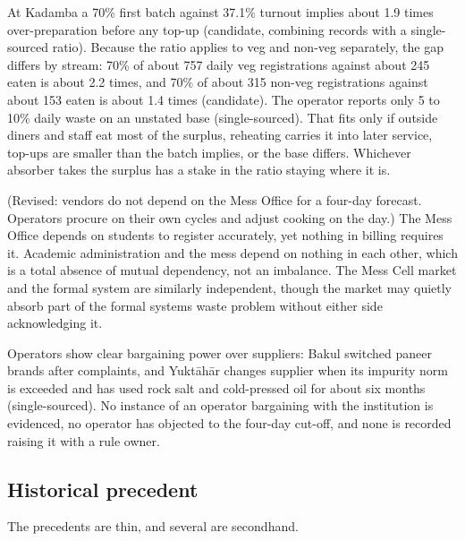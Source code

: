 \documentclass[
  10pt,
  table]{article}
\newcounter{none} %
\begin{document}
At Kadamba a 70\% first batch against 37.1\% turnout implies about 1.9 times over-preparation before any top-up (candidate, combining records with a single-sourced ratio). Because the ratio applies to veg and non-veg separately, the gap differs by stream: 70\% of about 757 daily veg registrations against about 245 eaten is about 2.2 times, and 70\% of about 315 non-veg registrations against about 153 eaten is about 1.4 times (candidate). The operator reports only 5 to 10\% daily waste on an unstated base (single-sourced). That fits only if outside diners and staff eat most of the surplus, reheating carries it into later service, top-ups are smaller than the batch implies, or the base differs. Whichever absorber takes the surplus has a stake in the ratio staying where it is.

(Revised: vendors do not depend on the Mess Office for a four-day forecast. Operators procure on their own cycles and adjust cooking on the day.) The Mess Office depends on students to register accurately, yet nothing in billing requires it. Academic administration and the mess depend on nothing in each other, which is a total absence of mutual dependency, not an imbalance. The Mess Cell market and the formal system are similarly independent, though the market may quietly absorb part of the formal system\textquotesingle s waste problem without either side acknowledging it.

Operators show clear bargaining power over suppliers: Bakul switched paneer brands after complaints, and Yuktāhār changes supplier when its impurity norm is exceeded and has used rock salt and cold-pressed oil for about six months (single-sourced). No instance of an operator bargaining with the institution is evidenced, no operator has objected to the four-day cut-off, and none is recorded raising it with a rule owner.

\subsection{Historical precedent}\label{historical-precedent}

The precedents are thin, and several are secondhand.
\end{document}
